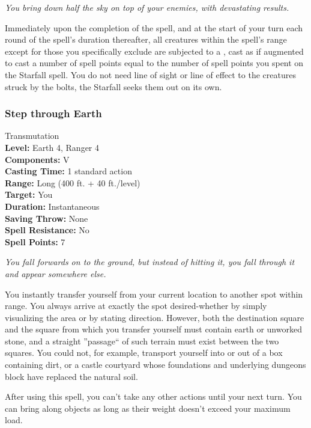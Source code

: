 \emph{You bring down half the sky on top of your enemies, with devastating results.}

Immediately upon the completion of the spell, and at the start of your turn each round of the spell's duration thereafter, all creatures within the spell's range except for those you specifically exclude are subjected to a , cast as if augmented to cast a number of spell points equal to the number of spell points you spent on the Starfall spell. You do not need line of sight or line of effect to the creatures struck by the bolts, the Starfall seeks them out on its own.

\subsubsection{Step through Earth}
\label{Spell:StepThroughEarth}
Transmutation
\\ \textbf{Level:} Earth 4, Ranger 4
\\ \textbf{Components:} V
\\ \textbf{Casting Time:} 1 standard action
\\ \textbf{Range:} Long (400 ft. + 40 ft./level)
\\ \textbf{Target:} You
\\ \textbf{Duration:} Instantaneous
\\ \textbf{Saving Throw:} None
\\ \textbf{Spell Resistance:} No
\\ \textbf{Spell Points:} 7

\emph{You fall forwards on to the ground, but instead of hitting it, you fall through it and appear somewhere else.}

You instantly transfer yourself from your current location to another spot within range.
You always arrive at exactly the spot desired-whether by simply visualizing the area or by stating direction.
However, both the destination square and the square from which you transfer yourself must contain earth or unworked stone, and a straight ''passage`` of such terrain must exist between the two squares. You could not, for example, transport yourself into or out of a box containing dirt, or a castle courtyard whose foundations and underlying dungeons block have replaced the natural soil.

After using this spell, you can't take any other actions until your next turn. 
You can bring along objects as long as their weight doesn't exceed your maximum load. 


